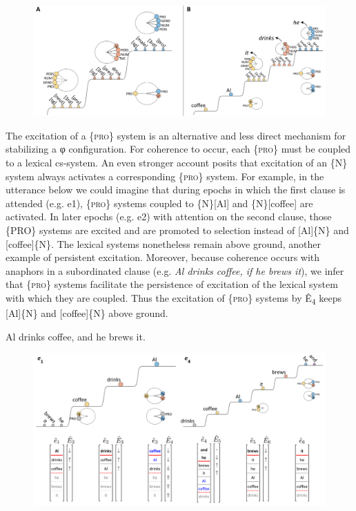   
\begin{figure}
\includegraphics[width=\textwidth]{figures/Tilsen-img152.png}
\caption{\missingcaption}
\label{fig:}
\end{figure}
 

  The excitation of a \{\textsc{pro}\} system is an alternative and less direct mechanism for stabilizing a φ configuration. For coherence to occur, each \{\textsc{pro}\} must be coupled to a lexical cs-system. An even stronger account posits that excitation of an \{N\} system always activates a corresponding \{\textsc{pro}\} system. For example, in the utterance below we could imagine that during epochs in which the first clause is attended (e.g. e1), \{\textsc{pro}\} systems coupled to \{N\}[Al] and \{N\}[coffee] are activated. In later epochs (e.g. e2) with attention on the second clause, those \{PRO\} systems are excited and are promoted to selection instead of [Al]\{N\} and [coffee]\{N\}. The lexical systems nonetheless remain above ground, another example of persistent excitation. Moreover, because coherence occurs with anaphors in a subordinated clause (e.g. \textit{Al drinks coffee, if he brews it}), we infer that \{\textsc{pro}\} systems facilitate the persistence of excitation of the lexical system with which they are coupled. Thus the excitation of \{\textsc{pro}\} systems by Ê\textsubscript{4} keeps [Al]\{N\} and [coffee]\{N\} above ground.

  \ea
  {Al drinks coffee, and he brews it.}
\z
  
\begin{figure}
\includegraphics[width=\textwidth]{figures/Tilsen-img153.png}
\caption{\missingcaption}
\label{fig:}
\end{figure}
 

